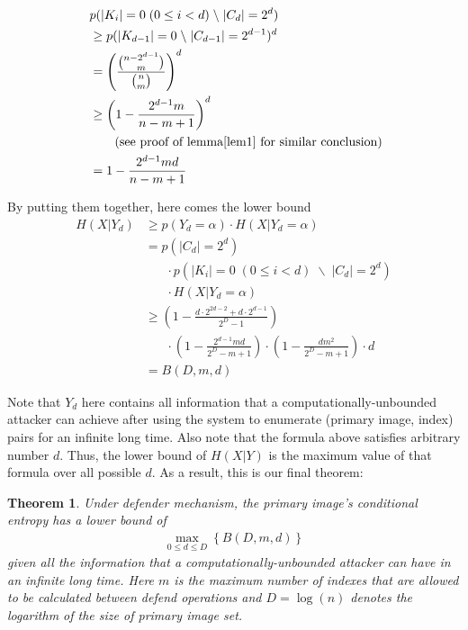 \documentclass[10pt, conference, compsocconf]{IEEEtran}
\newtheorem{mytheorem}{Theorem}
\begin{document}
		\begin{IEEEproof}
			\begin{align*}
				&p(|K_i| = 0	\; (0 \leq i < d) \; \backslash \; |C_d| = 2^d) \\\
					&\geq p(|K_{d-1}| = 0 \; \backslash \; |C_{d-1}| = 2^{d-1})^d\\
					&= \left(\frac{\binom{n-2^{d-1}}{m}}{\binom{n}{m}} \right)^d\\
					&\geq \left(1-\frac{2^{d-1}m}{n-m+1}\right)^d	\; \\
					& \;\;\;\;\;\; \text{ (see proof of lemma\ref{lem1} for similar conclusion})\\
					&= 1-\frac{2^{d-1}m d}{n-m+1}
			\end{align*}
		\end{IEEEproof}
		
		By putting them together, here comes the lower bound
		\begin{align*}
			H(X | Y_d) &\geq p(Y_d = \alpha) \cdot H(X | Y_d = \alpha)\\
				&= p(|C_d| = 2^d) \\
					&\;\;\;\;\;\; \cdot p(|K_i| = 0	\; (0 \leq i < d) \; \backslash \; |C_d| = 2^d) \\
					&\;\;\;\;\;\; \cdot H(X | Y_d = \alpha)\\
				&\geq (1-\frac{d \cdot 2^{2d-2}+d \cdot 2^{d-1}}{2^D-1})\\
					&\;\;\;\;\;\; \cdot (1-\frac{2^{d-1}m d}{2^D-m+1}) 
					\cdot (1-\frac{dm^2}{2^D-m+1}) \cdot d \\
				&= B(D, m, d)
		\end{align*}
		
		Note that $Y_d$ here contains all
		information that a computationally-unbounded
		attacker can achieve after
		using the system to enumerate (primary image, index) pairs
		for an infinite long time. Also note that the formula above
		satisfies arbitrary number $d$. Thus, the lower bound
		of $H(X | Y)$ is the maximum value of that formula
		over all possible $d$.
		As a result, this is our final theorem:
		\begin{mytheorem}\label{thm1}
			Under defender mechanism,
			the primary image's conditional entropy has a lower bound of
			\begin{align*}
				\max_{0 \leq d \leq D} \left\{ B(D, m, d) \right\}
			\end{align*}
			given all the information
			that a computationally-unbounded attacker can
			have in an infinite long time. Here $m$ is
			the maximum number of indexes that are allowed to be calculated
			between defend operations and $D = \log(n)$ denotes the
			logarithm of the size of primary image set.
		\end{mytheorem}
		
\end{document}
